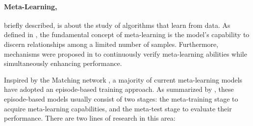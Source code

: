 \documentclass[letterpaper]{article} %
\newcommand{\yr}[1]{\textcolor{black}{#1}}
\begin{document}
\paragraph{Meta-Learning,} briefly described, is about the study of algorithms that learn from data. As defined in \cite{labelequiv:metadefinition}, the fundamental concept of meta-learning is the model's capability to discern relationships among a limited number of samples.
Furthermore, mechanisms were proposed in \cite{label_equiv:matchingnetwork} to continuously verify meta-learning abilities while simultaneously enhancing performance.

Inspired by the Matching network \cite{label_equiv:matchingnetwork}, a majority of current meta-learning models have adopted an episode-based training approach. As summarized by \citet{nonepisodic:transferminitocars}, these episode-based models usually consist of two stages: the meta-training stage to acquire meta-learning capabilities, and the meta-test stage to evaluate their performance. There are two lines of research in this area:

\end{document}
